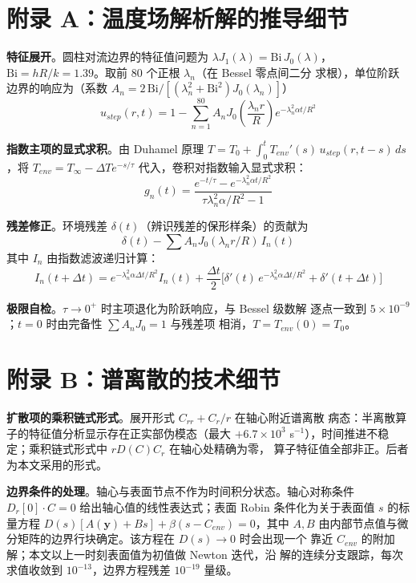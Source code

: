 \section{附录 A：温度场解析解的推导细节}

\textbf{特征展开}。圆柱对流边界的特征值问题为
$\lambda J_1(\lambda)=\mathrm{Bi}\,J_0(\lambda)$，
$\mathrm{Bi}=hR/k=1.39$。取前 80 个正根 $\lambda_n$（在 Bessel 零点间二分
求根），单位阶跃边界的响应为（系数 $A_n=2\,\mathrm{Bi}/[(\lambda_n^2+\mathrm{Bi}^2)J_0(\lambda_n)]$）
\begin{equation}
u_{step}(r,t)=1-\sum_{n=1}^{80}A_n J_0\!\left(\frac{\lambda_n r}{R}\right)e^{-\lambda_n^2\alpha t/R^2}
\end{equation}

\textbf{指数主项的显式求积}。由 Duhamel 原理
$T=T_0+\int_0^t T_{env}'(s)\,u_{step}(r,t-s)\,ds$，将
$T_{env}=T_\infty-\Delta T e^{-s/\tau}$ 代入，卷积对指数输入显式求积：
\begin{equation}
g_n(t)=\frac{e^{-t/\tau}-e^{-\lambda_n^2\alpha t/R^2}}{\tau\lambda_n^2\alpha/R^2-1}
\end{equation}

\textbf{残差修正}。环境残差 $\delta(t)$（辨识残差的保形样条）的贡献为
\[
\delta(t)-\sum A_n J_0(\lambda_n r/R)\,I_n(t)
\]
其中 $I_n$ 由指数滤波递归计算：
\begin{equation}
I_n(t+\Delta t)=e^{-\lambda_n^2\alpha\Delta t/R^2}I_n(t)
+\frac{\Delta t}{2}\Big[\delta'(t)\,e^{-\lambda_n^2\alpha\Delta t/R^2}+\delta'(t+\Delta t)\Big]
\end{equation}

\textbf{极限自检}。$\tau\to0^+$ 时主项退化为阶跃响应，与 Bessel 级数解
逐点一致到 $5\times10^{-9}$；$t=0$ 时由完备性 $\sum A_n J_0=1$ 与残差项
相消，$T=T_{env}(0)=T_0$。

\section{附录 B：谱离散的技术细节}

\textbf{扩散项的乘积链式形式}。展开形式 $C_{rr}+C_r/r$ 在轴心附近谱离散
病态：半离散算子的特征值分析显示存在正实部伪模态（最大 $+6.7\times10^3$
s$^{-1}$），时间推进不稳定；乘积链式形式中 $rD(C)C_r$ 在轴心处精确为零，
算子特征值全部非正。后者为本文采用的形式。

\textbf{边界条件的处理}。轴心与表面节点不作为时间积分状态。轴心对称条件
$D_r[0]\cdot C=0$ 给出轴心值的线性表达式；表面 Robin 条件化为关于表面值
$s$ 的标量方程 $D(s)[A(\mathbf{y})+B s]+\beta(s-C_{env})=0$，其中 $A,B$
由内部节点值与微分矩阵的边界行块确定。该方程在 $D(s)\to0$ 时会出现一个
靠近 $C_{env}$ 的附加解；本文以上一时刻表面值为初值做 Newton 迭代，沿
解的连续分支跟踪，每次求值收敛到 $10^{-13}$，边界方程残差 $10^{-19}$
量级。

